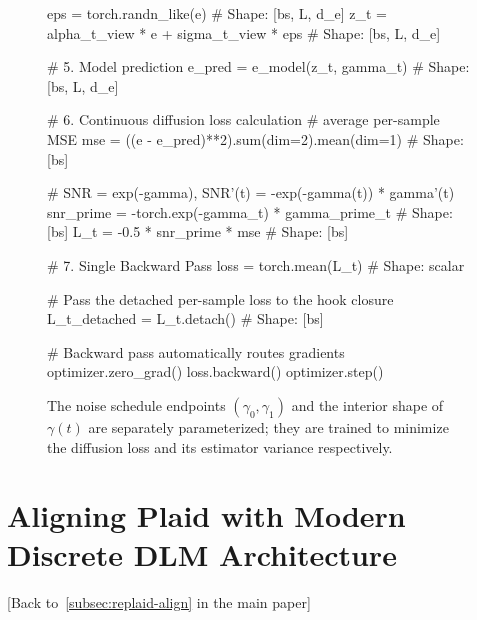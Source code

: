 \documentclass{article}
\begin{document}
\begin{figure}[H]
\begin{minipage}{\linewidth}
\begin{python}
    eps = torch.randn_like(e)  # Shape: [bs, L, d_e]
    z_t = alpha_t_view * e + sigma_t_view * eps  # Shape: [bs, L, d_e]
    
    # 5. Model prediction
    e_pred = e_model(z_t, gamma_t)  # Shape: [bs, L, d_e]
    
    # 6. Continuous diffusion loss calculation
    # average per-sample MSE
    mse = ((e - e_pred)**2).sum(dim=2).mean(dim=1)  # Shape: [bs]
    
    # SNR = exp(-gamma), SNR'(t) = -exp(-gamma(t)) * gamma'(t)
    snr_prime = -torch.exp(-gamma_t) * gamma_prime_t  # Shape: [bs]
    L_t = -0.5 * snr_prime * mse  # Shape: [bs]
    
    # 7. Single Backward Pass
    loss = torch.mean(L_t)  # Shape: scalar
    
    # Pass the detached per-sample loss to the hook closure
    L_t_detached = L_t.detach()  # Shape: [bs]
    
    # Backward pass automatically routes gradients
    optimizer.zero_grad()
    loss.backward() 
    optimizer.step()
\end{python}
\end{minipage}
    \caption{\small The noise schedule endpoints $(\gamma_0, \gamma_1)$ and the interior shape of $\gamma(t)$ are separately parameterized; they are trained to minimize the diffusion loss and its estimator variance respectively.}
    \label{fig:diffusion-loss-code}
\end{figure}

\clearpage

\section{Aligning Plaid with Modern Discrete DLM Architecture}\label{supp:sec:align-table}

[Back to~\cref{subsec:replaid-align} in the main paper]

%

%

%

%
\end{document}
